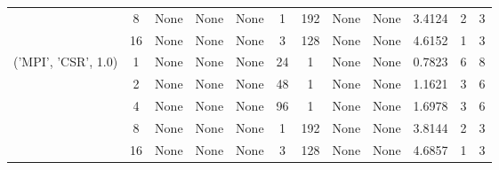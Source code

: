 \begin{tabular}{cccccccccccc}
& 8& None& None& None& 1& 192& None& None& 3.4124& 2& 3\\
& 16& None& None& None& 3& 128& None& None& 4.6152& 1& 3\\
\hline
\multirow{5}{*}{('MPI', 'CSR', 1.0)}& 1& None& None& None& 24& 1& None& None& 0.7823& 6& 8\\
& 2& None& None& None& 48& 1& None& None& 1.1621& 3& 6\\
& 4& None& None& None& 96& 1& None& None& 1.6978& 3& 6\\
& 8& None& None& None& 1& 192& None& None& 3.8144& 2& 3\\
& 16& None& None& None& 3& 128& None& None& 4.6857& 1& 3\\
\hline
\end{tabular}



